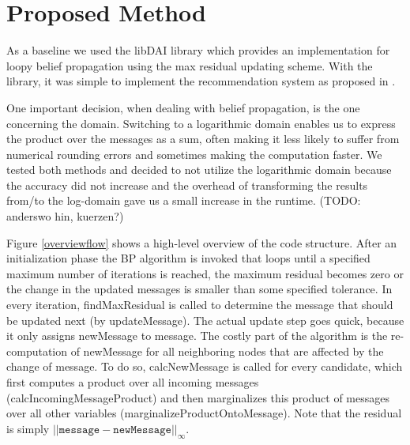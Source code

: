 \section{Proposed Method}\label{sec:method}



As a baseline we used the libDAI library \cite{Mooij_libDAI_10} which provides an implementation for loopy belief propagation using the max residual updating scheme. With the library, it was simple to implement the recommendation system as proposed in \cite{Ha:2012:TRT:2396761.2398636}.

One important decision, when dealing with belief propagation, is the one concerning the domain. Switching to a logarithmic domain enables us to express the product over the messages as a sum, often making it less likely to suffer from numerical rounding errors and sometimes making the computation faster. We tested both methods and decided to not utilize the logarithmic domain because the accuracy did not increase and the overhead of transforming the results from/to the log-domain gave us a small increase in the runtime. (TODO: anderswo hin, kuerzen?)

Figure \ref{overviewflow} shows a high-level overview of the code structure. After an initialization phase the BP algorithm is invoked that loops until a specified maximum number of iterations is reached, the maximum residual becomes zero or the change in the updated messages is smaller than some specified tolerance. In every iteration, findMaxResidual is called to determine the message that should be updated next (by updateMessage). The actual update step goes quick, because it only assigns newMessage to message. The costly part of the algorithm is the re-computation of newMessage for all neighboring nodes that are affected by the change of message. To do so, calcNewMessage is called for every candidate, which first computes a product over all incoming messages (calcIncomingMessageProduct) and then marginalizes this product of messages over all other variables (marginalizeProductOntoMessage). Note that the residual is simply $||\mathtt{message}-\mathtt{newMessage}||_\infty$. 

